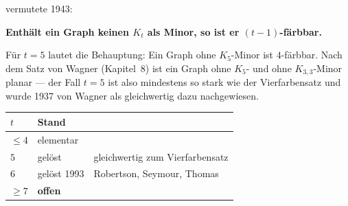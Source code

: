 \begin{merksatz}
 vermutete 1943:

\begin{center}
\begin{minipage}{0.9\textwidth}
\textbf{Enthält ein Graph keinen $K_t$ als Minor, so ist er $(t-1)$-färbbar.}
\end{minipage}
\end{center}

Für $t = 5$ lautet die Behauptung: Ein Graph ohne $K_5$-Minor ist $4$-färbbar. Nach dem Satz von Wagner (Kapitel~8) ist ein Graph ohne $K_5$- und ohne $K_{3,3}$-Minor planar --- der Fall $t=5$ ist also mindestens so stark wie der Vierfarbensatz und wurde 1937 von Wagner als gleichwertig dazu nachgewiesen.

\begin{center}
{\small
\renewcommand{\arraystretch}{1.45}
\begin{tabular}{@{}P{1.4cm}P{2.8cm}P{3.4cm}@{}}
\toprule
$t$ & \textbf{Stand} & \\
\midrule
$\le 4$ & \textcolor{gruen}{elementar} & \\
$5$ & \textcolor{gruen}{gelöst} & gleichwertig zum Vierfarbensatz\\
$6$ & \textcolor{gruen}{gelöst 1993} & Robertson, Seymour, Thomas\\
$\ge 7$ & \textcolor{akzent}{\textbf{offen}} & \\
\bottomrule
\end{tabular}}
\end{center}
\end{merksatz}

